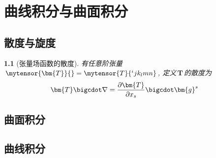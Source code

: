 \chapter{曲线积分与曲面积分}

\section{散度与旋度}
\newtheorem{divergence}[theorem_root]{}
\newtheorem{curl}[theorem_root]{}

\begin{divergence}[张量场函数的散度]
有任意阶张量\(\,\mytensor{\bm{T}}{}=\mytensor{T}{^ijk_lmn}\,\), 定义\(\,\bm{T}\,\)的散度为
\begin{align*}
    \bm{T}\bigcdot\nabla &= {\partial\bm{T}\over\partial x_s}\bigcdot\bm{g}^s
\end{align*}
\end{divergence}

\section{曲面积分}

\section{曲线积分}
